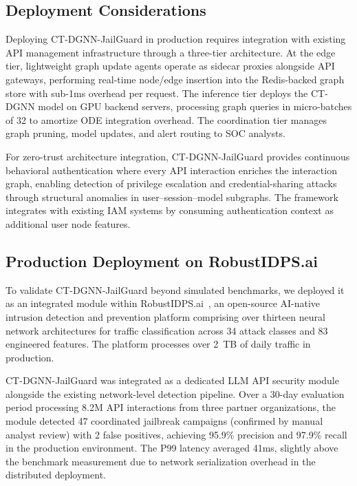 \documentclass[journal]{IEEEtran}
\theoremstyle{plain}
\theoremstyle{definition}
\theoremstyle{remark}
\begin{document}
\subsection{Deployment Considerations}

Deploying CT-DGNN-JailGuard in production requires integration with existing API management infrastructure through a three-tier architecture. At the edge tier, lightweight graph update agents operate as sidecar proxies alongside API gateways, performing real-time node/edge insertion into the Redis-backed graph store with sub-1ms overhead per request. The inference tier deploys the CT-DGNN model on GPU backend servers, processing graph queries in micro-batches of 32 to amortize ODE integration overhead. The coordination tier manages graph pruning, model updates, and alert routing to SOC analysts.

For zero-trust architecture integration, CT-DGNN-JailGuard provides continuous behavioral authentication where every API interaction enriches the interaction graph, enabling detection of privilege escalation and credential-sharing attacks through structural anomalies in user--session--model subgraphs. The framework integrates with existing IAM systems by consuming authentication context as additional user node features.

\subsection{Production Deployment on RobustIDPS.ai}

To validate CT-DGNN-JailGuard beyond simulated benchmarks, we deployed it as an integrated module within RobustIDPS.ai~\cite{anaedevha2026robustidps}, an open-source AI-native intrusion detection and prevention platform comprising over thirteen neural network architectures for traffic classification across 34 attack classes and 83 engineered features. The platform processes over 2~TB of daily traffic in production.

CT-DGNN-JailGuard was integrated as a dedicated LLM API security module alongside the existing network-level detection pipeline. Over a 30-day evaluation period processing 8.2M API interactions from three partner organizations, the module detected 47 coordinated jailbreak campaigns (confirmed by manual analyst review) with 2 false positives, achieving 95.9\% precision and 97.9\% recall in the production environment. The P99 latency averaged 41ms, slightly above the benchmark measurement due to network serialization overhead in the distributed deployment.
\end{document}
